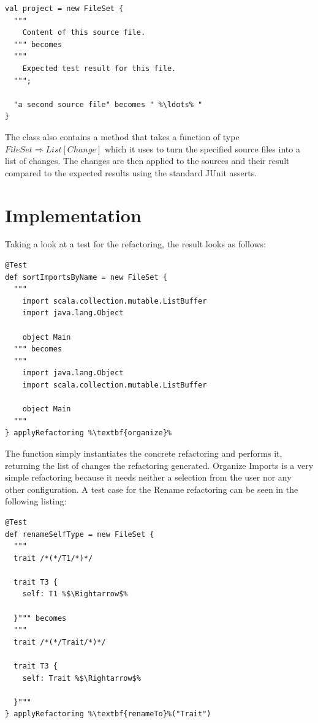 \documentclass[10pt,a4paper,oneside]{scrreprt}
\begin{document}
\begin{lstlisting}
val project = new FileSet {
  """
    Content of this source file.
  """ becomes
  """
    Expected test result for this file.
  """;

  "a second source file" becomes " %\ldots% "
}
\end{lstlisting}

The  class also contains a method  that takes a function of type $FileSet \Rightarrow List[Change]$ which it uses to turn the specified source files into a list of changes. The changes are then applied to the sources and their result compared to the expected results using the standard JUnit asserts.

\section{Implementation}

Taking a look at a test for the  refactoring, the result looks as follows:

\begin{lstlisting}
@Test
def sortImportsByName = new FileSet {
  """
    import scala.collection.mutable.ListBuffer
    import java.lang.Object

    object Main
  """ becomes
  """
    import java.lang.Object
    import scala.collection.mutable.ListBuffer

    object Main
  """
} applyRefactoring %\textbf{organize}%
\end{lstlisting}

The  function simply instantiates the concrete refactoring and performs it, returning the list of changes the refactoring generated. Organize Imports is a very simple refactoring because it needs neither a selection from the user nor any other configuration. A test case for the Rename refactoring can be seen in the following listing:

\begin{lstlisting}
@Test
def renameSelfType = new FileSet {
  """
  trait /*(*/T1/*)*/

  trait T3 {
    self: T1 %$\Rightarrow$%

  }""" becomes
  """
  trait /*(*/Trait/*)*/

  trait T3 {
    self: Trait %$\Rightarrow$%

  }"""
} applyRefactoring %\textbf{renameTo}%("Trait")
\end{lstlisting}
\end{document}
